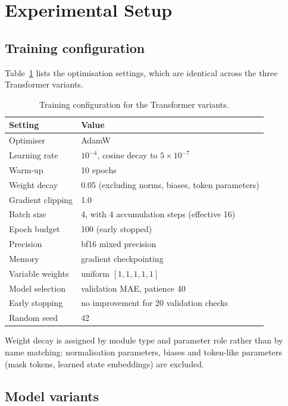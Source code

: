 \section{Experimental Setup}
\label{sec:setup}

\subsection{Training configuration}
\label{sec:setup:training}

Table~\ref{tab:hparams} lists the optimisation settings, which are identical
across the three Transformer variants.

\begin{table}[htbp]
\centering
\caption{Training configuration for the Transformer variants.}
\label{tab:hparams}
\begin{tabular}{ll}
\toprule
Setting & Value \\
\midrule
Optimiser              & AdamW~\cite{Loshchilov2019AdamW} \\
Learning rate          & $10^{-4}$, cosine decay to $5\times10^{-7}$ \\
Warm-up                & 10 epochs \\
Weight decay           & 0.05 (excluding norms, biases, token parameters) \\
Gradient clipping      & 1.0 \\
Batch size             & 4, with 4 accumulation steps (effective 16) \\
Epoch budget           & 100 (early stopped) \\
Precision              & bf16 mixed precision \\
Memory                 & gradient checkpointing \\
Variable weights       & uniform $[1,1,1,1,1]$ \\
Model selection        & validation MAE, patience 40 \\
Early stopping         & no improvement for 20 validation checks \\
Random seed            & 42 \\
\bottomrule
\end{tabular}
\end{table}

Weight decay is assigned by module type and parameter role rather than by
name matching: normalisation parameters, biases and token-like parameters
(mask tokens, learned state embeddings) are excluded.

\subsection{Model variants}
\label{sec:setup:variants}

